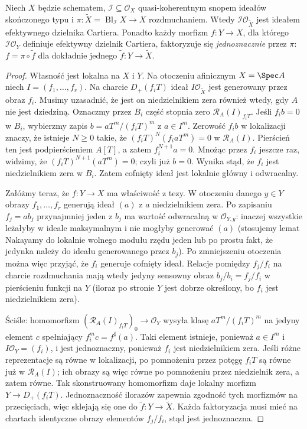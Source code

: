 \begin{twierdzenie}
\label{tw:ga5-universal}
Niech $X$ będzie schematem, $\mathcal I\subseteq\mathcal O_X$
quasi-koherentnym snopem ideałów skończonego typu i
$\pi:\widetilde X=\operatorname{Bl}_{\mathcal I}X\to X$
rozdmuchaniem. Wtedy $\mathcal I\mathcal O_{\widetilde X}$
jest ideałem efektywnego dzielnika Cartiera. Ponadto
każdy morfizm $f:Y\to X$, dla którego
$\mathcal I\mathcal O_Y$ definiuje efektywny dzielnik
Cartiera, faktoryzuje się \emph{jednoznacznie} przez $\pi$:
$ f=\pi\circ\widetilde f$ dla dokładnie jednego
$\widetilde f:Y\to\widetilde X$.
\end{twierdzenie}
\begin{proof}
Własność jest lokalna na $X$ i $Y$. Na otoczeniu
afinicznym $X=\Spec A$ niech $I=(f_1,\ldots,f_r)$.
Na charcie $D_+(f_iT)$ ideał $I\mathcal O_{\widetilde X}$
jest generowany przez obraz $f_i$. Musimy uzasadnić,
że jest on niedzielnikiem zera również wtedy, gdy $A$
nie jest dziedziną. Oznaczmy przez $B_i$ część stopnia
zero $\mathcal R_A(I)_{f_iT}$. Jeśli $f_i b=0$ w $B_i$,
wybierzmy zapis $b=aT^m/(f_iT)^m$ z $a\in I^m$.
Zerowość $f_i b$ w lokalizacji znaczy, że istnieje
$N\ge0$ takie, że $(f_iT)^N(f_i aT^m)=0$
w $\mathcal R_A(I)$. Pierścień ten jest podpierścieniem
$A[T]$, a zatem $f_i^{N+1}a=0$. Mnożąc przez $f_i$
jeszcze raz, widzimy, że $(f_iT)^{N+1}(aT^m)=0$;
czyli już $b=0$. Wynika stąd, że $f_i$ jest
niedzielnikiem zera w $B_i$. Zatem cofnięty ideał
jest lokalnie główny i odwracalny.

Załóżmy teraz, że $f:Y\to X$ ma właściwość z tezy.
W otoczeniu danego $y\in Y$ obrazy $f_1,\ldots,f_r$
generują ideał $(a)$ z $a$ niedzielnikiem zera.
Po zapisaniu $f_j=ab_j$ przynajmniej jeden z $b_j$
ma wartość odwracalną w $\mathcal O_{Y,y}$: inaczej
wszystkie leżałyby w ideale maksymalnym i nie mogłyby
generować $(a)$ (stosujemy lemat Nakayamy do lokalnie
wolnego modułu rzędu jeden lub po prostu fakt, że
jedynka należy do ideału generowanego przez $b_j$).
Po zmniejszeniu otoczenia można więc przyjąć, że
$f_i$ generuje cofnięty ideał. Relacje pomiędzy
$f_j/f_i$ na charcie rozdmuchania mają wtedy jedyny
sensowny obraz $b_j/b_i=f_j/f_i$ w pierścieniu
funkcji na $Y$ (iloraz po stronie $Y$ jest dobrze
określony, bo $f_i$ jest niedzielnikiem zera).

Ściśle: homomorfizm
$(\mathcal R_A(I)_{f_iT})_0\to\mathcal O_Y$
wysyła klasę $aT^m/(f_iT)^m$ na jedyny element
$c$ spełniający $f_i^m c=f^\sharp(a)$.
Taki element istnieje, ponieważ $a\in I^m$ i
$I\mathcal O_Y=(f_i)$, i jest jednoznaczny,
ponieważ $f_i$ jest niedzielnikiem zera.
Jeśli różne reprezentacje są równe w lokalizacji,
po pomnożeniu przez potęgę $f_iT$ są równe już w
$\mathcal R_A(I)$; ich obrazy są więc równe po
pomnożeniu przez niedzielnik zera, a zatem równe.
Tak skonstruowany homomorfizm daje lokalny morfizm
$Y\to D_+(f_iT)$. Jednoznaczność ilorazów zapewnia
zgodność tych morfizmów na przecięciach, więc
sklejają się one do $\widetilde f:Y\to\widetilde X$.
Każda faktoryzacja musi mieć na chartach identyczne
obrazy elementów $f_j/f_i$, stąd jest jednoznaczna.
\end{proof}

